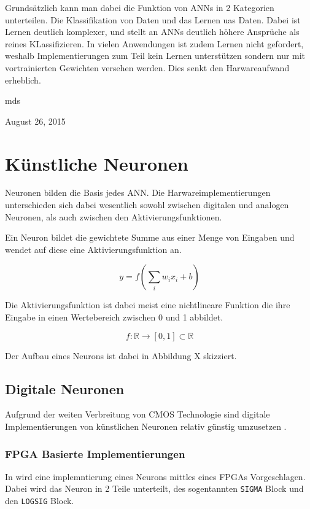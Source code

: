 \documentclass[conference]{IEEEtran}
\begin{document}
    Grundsätzlich kann man dabei die Funktion von ANNs in 2 Kategorien unterteilen.
    Die Klassifikation von Daten und das Lernen uas Daten.
    Dabei ist Lernen deutlich komplexer, und stellt an ANNs deutlich höhere Ansprüche als reines KLassifizieren.
    In vielen Anwendungen ist zudem Lernen nicht gefordert, weshalb Implementierungen zum Teil kein Lernen unterstützen sondern nur mit vortrainierten Gewichten versehen werden.
    Dies senkt den Harwareaufwand erheblich.


    \hfill mds

    \hfill August 26, 2015


    \section{Künstliche Neuronen}
    Neuronen bilden die Basis jedes ANN.
    Die Harwareimplementierungen unterschieden sich dabei wesentlich sowohl zwischen digitalen und analogen Neuronen, als auch zwischen den Aktivierungsfunktionen.
    \cite{habib1989digital}

    Ein Neuron bildet die gewichtete Summe aus einer Menge von Eingaben und wendet auf diese eine Aktivierungsfunktion an.

    \[y = f(\sum_i {w_ix_i} + b)\]

    Die Aktivierungsfunktion ist dabei meist eine nichtlineare Funktion die ihre Eingabe in einen Wertebereich zwischen 0 und 1 abbildet.

    \[ f: \mathbb{R} \to [0,1] \subset \mathbb{R} \]

    Der Aufbau eines Neurons ist dabei in Abbildung X skizziert.

    \subsection{Digitale Neuronen}

    Aufgrund der weiten Verbreitung von CMOS Technologie sind digitale Implementierungen von künstlichen Neuronen relativ günstig umzusetzen\cite{misra2010artificial} .

    \subsubsection{FPGA Basierte Implementierungen}
    In \cite{muthuramalingam2008neural} wird eine implemntierung eines Neurons mittles eines FPGAs Vorgeschlagen.
    Dabei wird das Neuron in 2 Teile unterteilt, des sogentannten \texttt{SIGMA} Block und den \texttt{LOGSIG} Block.
\end{document}
